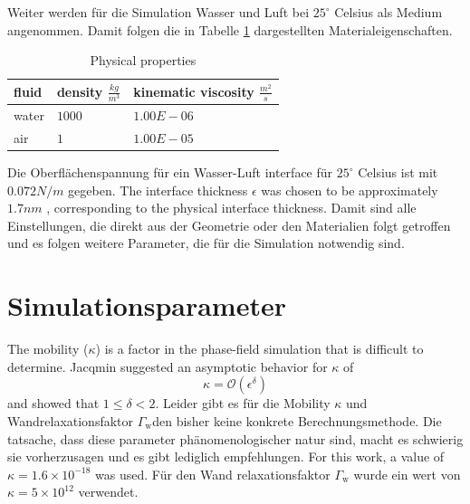 Weiter werden für die Simulation Wasser und Luft bei $25^{\circ}$ Celsius als Medium angenommen. Damit folgen die in Tabelle \ref{tab:physicalProperties_CaseSetup} dargestellten Materialeigenschaften. 
\begin{table}[h]
    \centering
    \caption{Physical properties}
    \label{tab:physicalProperties_CaseSetup}
    \begin{tabular}{lll}
    fluid & density $\frac{kg}{m^3}$ & kinematic viscosity $\frac{m^2}{s}$ \\ \hline
    water & $1000$                     & $1.00E-06$                          \\
    air   & $1$                        & $1.00E-05$                          \\ 
    \end{tabular}
    \end{table}
Die Oberflächenspannung für ein Wasser-Luft interface für $25^{\circ}$ Celsius ist mit \(0.072 N/m\) gegeben. The interface thickness \( \epsilon \) was chosen to be approximately \(1.7 nm\) \cite{bagheriInterfacialRelaxationCrucial2022}, corresponding to the physical interface thickness. 
Damit sind alle Einstellungen, die direkt aus der Geometrie oder den Materialien folgt getroffen und es folgen weitere Parameter, die für die Simulation notwendig sind.

\section{Simulationsparameter}
The mobility ($\kappa$) is a factor in the phase-field simulation that is difficult to determine. Jacqmin \cite{jacqmin1999CalculationTwoPhaseNavier} suggested an asymptotic behavior for \( \kappa \) of 
\begin{equation}
    \kappa = \mathcal{O}(\epsilon^{\delta})
\end{equation}
and showed that \( 1 \leq \delta < 2 \). Leider gibt es für die Mobility $\kappa$ und Wandrelaxationsfaktor $\Gamma_{\mathrm{w}}$den bisher keine konkrete Berechnungsmethode. Die tatsache, dass diese parameter phänomenologischer natur sind, macht es schwierig sie vorherzusagen und es gibt lediglich empfehlungen. 
For this work, a value of \( \kappa = 1.6 \times 10^{-18} \) was used. Für den Wand relaxationsfaktor $\Gamma_{\mathrm{w}}$ wurde ein wert von \( \kappa = 5 \times 10^{12} \) verwendet. 

